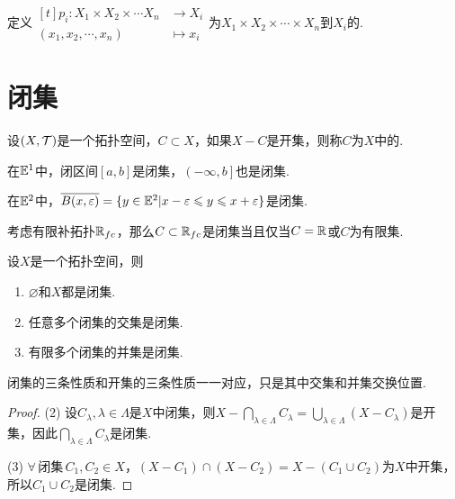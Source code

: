 \begin{definition}[投射][def:2.8]
    定义$\begin{aligned}[t]
        p_i: X_1\times X_2\times\cdots X_n &\to X_i \\
        (x_1,x_2,\cdots,x_n) &\mapsto x_i
    \end{aligned}$为$X_1\times X_2\times\cdots\times X_n$到$X_i$的.
\end{definition}

\section{闭集}

\begin{definition}[闭集][def:2.9]
    设$(X,\mathcal{T})$是一个拓扑空间，$C\subset X$，如果$X-C$是开集，则称$C$为$X$中的.
\end{definition}

\begin{instance}
    在$\mathbb{E}^1$中，闭区间$\left[a,b\right]$是闭集，$\left(-\infty,b\right]$也是闭集.\par
    在$\mathbb{E}^2$中，$\overline{B(x,\varepsilon)}=\{y\in\mathbb{E}^2|x-\varepsilon\leqslant y\leqslant x+\varepsilon\}$是闭集.
\end{instance}

\begin{instance}
    考虑有限补拓扑$\mathbb{R}_{fc}$，那么$C\subset\mathbb{R}_{fc}$是闭集当且仅当$C=\mathbb{R}$或$C$为有限集.
\end{instance}


\begin{proposition}[闭集的性质][prop:2.5]
    设$X$是一个拓扑空间，则
    \begin{enumerate}
        \item $\varnothing$和$X$都是闭集.
        \item 任意多个闭集的交集是闭集.
        \item 有限多个闭集的并集是闭集.
    \end{enumerate}
\end{proposition}
闭集的三条性质和开集的三条性质一一对应，只是其中交集和并集交换位置.
\begin{proof}
    (2) 设$C_\lambda,\lambda\in\Lambda$是$X$中闭集，则$X-\bigcap_{\lambda\in\Lambda}C_\lambda=\bigcup_{\lambda\in\Lambda}(X-C_\lambda)$是开集，因此$\bigcap_{\lambda\in\Lambda}C_\lambda$是闭集.\par
    (3) $\forall\, \text{闭集}\,C_1,C_2\in X$，$(X-C_1)\cap(X-C_2)=X-(C_1\cup C_2)$为$X$中开集，所以$C_1\cup C_2$是闭集.
\end{proof}


